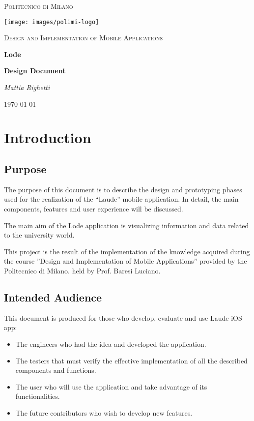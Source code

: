 \documentclass[numbers=noenddot, 12pt, a4paper, oneside]{scrbook}
\begin{document}
\begin{titlepage}
	\centering
	{\scshape\LARGE Politecnico di Milano \par}
	\vspace{1cm}
	\texttt{[image: images/polimi-logo]}\par
	\vspace{1cm}

	{\scshape\Large Design and Implementation of Mobile Applications\par}
	\vspace{1.5cm}
	{\huge\bfseries Lode \par}
	\vspace{1cm}
	{\Large\bfseries Design Document \par}
	\vspace{3cm}
	{\Large\itshape Mattia Righetti\par}
	\vspace{1.5cm}
	\vfill
	


	\vfill

	{\large \today\par}
\end{titlepage}

\newpage
\tableofcontents
\newpage


\chapter{Introduction}

\section{Purpose}
The purpose of this document is to describe the design and prototyping phases used for the realization of the “Laude” mobile application. In detail, the main components, features and user experience will be discussed.

The main aim of the Lode application is visualizing information and data related to the university world.

This project is the result of the  implementation of the knowledge acquired during the course ”Design and Implementation of Mobile Applications” provided by the Politecnico di Milano. held by Prof. Baresi Luciano.

\section{Intended Audience}
This document is produced for those who develop, evaluate and use Laude iOS app:
\begin{itemize}
	\item The engineers who had the idea and developed the application.
	\item The testers that must verify the effective implementation of all the described components and functions.
	\item The user who will use the application and take advantage of its functionalities.
	\item The future contributors who wish to develop new features.
\end{itemize}
\end{document}
